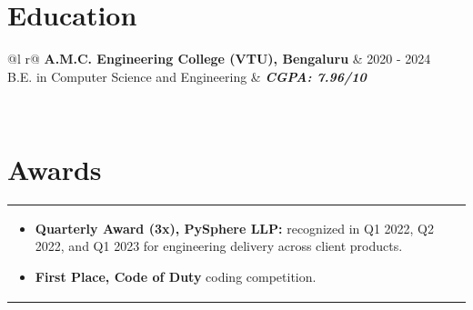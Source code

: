 \documentclass[a4paper,8pt]{article}
\begin{document}
\section{Education}
\begin{tabularx}{\linewidth}{ @{}l r@{} }
\color[HTML]{1C033C} \textbf{A.M.C. Engineering College (VTU), Bengaluru} & \hfill \color[HTML]{371e77} 2020 - 2024 \\
\color[HTML]{371e77} B.E. in Computer Science and Engineering & \hfill \color[HTML]{4B28A4} \textit{\textbf{CGPA: 7.96/10}} \\
\end{tabularx}\\[3pt]

\section{Awards}
\begin{tabularx}{\linewidth}{ @{}l r@{} }
\begin{minipage}[t]{\linewidth}
    \begin{itemize}[nosep,after=\strut, leftmargin=2em, itemsep=2pt]
        \item \textbf{Quarterly Award (3x), PySphere LLP:} recognized in Q1 2022, Q2 2022, and Q1 2023 for engineering delivery across client products.
        \item \textbf{First Place, Code of Duty} coding competition.
    \end{itemize}
\end{minipage}
\end{tabularx}
\end{document}
